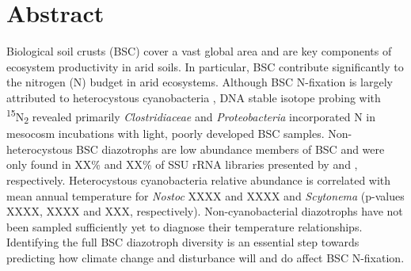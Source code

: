 \section{Abstract}
Biological soil crusts (BSC) cover a vast global area and are key components of ecosystem productivity in arid soils. In particular, BSC contribute significantly to the nitrogen (N) budget in arid ecosystems. Although BSC N-fixation is largely attributed to heterocystous cyanobacteria \cite{Yeager, 14766579, Yeager_2012}, DNA stable isotope probing with \textsuperscript{15}N\textsubscript{2} revealed primarily \textit{Clostridiaceae} and \textit{Proteobacteria} incorporated N in mesocosm incubations with light, poorly developed BSC samples. Non-heterocystous BSC diazotrophs are low abundance members of BSC and were only found in XX\% and XX\% of SSU rRNA libraries presented by \citet{Garcia_Pichel_2013} and \citet{Steven_2013}, respectively. Heterocystous cyanobacteria relative abundance is correlated with mean annual temperature for \textit{Nostoc} XXXX and XXXX and \textit{Scytonema} (p-values XXXX, XXXX and XXX, respectively). Non-cyanobacterial diazotrophs have not been sampled sufficiently yet to diagnose their temperature relationships. Identifying the full BSC diazotroph diversity is an essential step towards predicting how climate change and disturbance will and do affect BSC N-fixation.